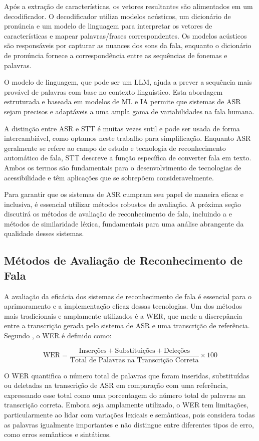 Após a extração de características, os vetores resultantes são alimentados em um decodificador. O decodificador utiliza modelos acústicos, um dicionário de pronúncia e um modelo de linguagem para interpretar os vetores de características e mapear palavras/frases correspondentes. Os modelos acústicos são responsáveis por capturar as nuances dos sons da fala, enquanto o dicionário de pronúncia fornece a correspondência entre as sequências de fonemas e palavras.

O modelo de linguagem, que pode ser um LLM, ajuda a prever a sequência mais provável de palavras com base no contexto linguístico. Esta abordagem estruturada e baseada em modelos de ML e IA permite que sistemas de ASR sejam precisos e adaptáveis a uma ampla gama de variabilidades na fala humana.

A distinção entre ASR e STT é muitas vezes sutil e pode ser usada de forma intercambiável, como optamos neste trabalho para simplificação. Enquanto ASR geralmente se refere ao campo de estudo e tecnologia de reconhecimento automático de fala, STT descreve a função específica de converter fala em texto. Ambos os termos são fundamentais para o desenvolvimento de tecnologias de acessibilidade e têm aplicações que se sobrepõem consideravelmente.

Para garantir que os sistemas de ASR cumpram seu papel de maneira eficaz e inclusiva, é essencial utilizar métodos robustos de avaliação. A próxima seção discutirá os métodos de avaliação de reconhecimento de fala, incluindo a  e métodos de similaridade léxica, fundamentais para uma análise abrangente da qualidade desses sistemas.

\subsection{Métodos de Avaliação de Reconhecimento de Fala}

A avaliação da eficácia dos sistemas de reconhecimento de fala é essencial para o aprimoramento e a implementação eficaz dessas tecnologias. Um dos métodos mais tradicionais e amplamente utilizados é a WER, que mede a discrepância entre a transcrição gerada pelo sistema de ASR e uma transcrição de referência. Segundo \cite{Jurafsky2024}, o WER é definido como:

\[
\text{WER} = \frac{\text{Inserções} + \text{Substituições} + \text{Deleções}}{\text{Total de Palavras na Transcrição Correta}} \times 100
\]

O WER quantifica o número total de palavras que foram inseridas, substituídas ou deletadas na transcrição de ASR em comparação com uma referência, expressando esse total como uma porcentagem do número total de palavras na transcrição correta. Embora seja amplamente utilizado, o WER tem limitações, particularmente ao lidar com variações lexicais e semânticas, pois considera todas as palavras igualmente importantes e não distingue entre diferentes tipos de erro, como erros semânticos e sintáticos.

